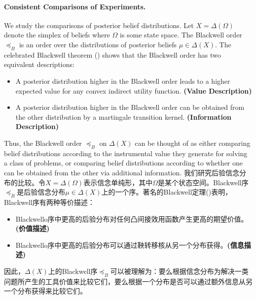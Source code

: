 \documentclass[12pt,letterpaper]{article}
\newenvironment{original}{\color{black}}{}
\newenvironment{translation}{\color{blue}}{}
\theoremstyle{plain}
\theoremstyle{definition}
\theoremstyle{remark}
\theoremstyle{definition}
\begin{document}
\paragraph{Consistent Comparisons of Experiments.}\hspace{-2mm}
\begin{original}
We study the comparisons of posterior belief distributions. Let $X=\Delta(\Omega)$ denote the simplex of beliefs where $\Omega$ is some state space. The Blackwell order $\preceq_B$ is an order over the distributions of posterior beliefs $\mu \in \Delta(X)$. The celebrated Blackwell theorem (\citealt{Blackwell1951Comparison}) shows that the Blackwell order has two equivalent descriptions:
\begin{itemize}
    \item[(i)] A posterior distribution higher in the Blackwell order leads to a higher expected value for any convex indirect utility function. \qquad \qquad  \qquad   \quad     \textbf{(Value Description)}
    \item[(ii)] A posterior distribution higher in the Blackwell order can be obtained from the other distribution by a martingale transition kernel. \quad        \textbf{(Information Description)}
\end{itemize}
Thus, the Blackwell order $\preceq_B$ on $\Delta(X)$ can be thought of as either comparing belief distributions according to the instrumental value they generate for solving a class of problems, or comparing belief distributions according to whether one can be obtained from the other via additional information.
\end{original}
\begin{translation}
我们研究后验信念分布的比较。令$X=\Delta(\Omega)$表示信念单纯形，其中$\Omega$是某个状态空间。Blackwell序$\preceq_B$是后验信念分布$\mu \in \Delta(X)$上的一个序。著名的Blackwell定理(\citealt{Blackwell1951Comparison})表明，Blackwell序有两种等价描述：
\begin{itemize}
    \item[(i)] Blackwello序中更高的后验分布对任何凸间接效用函数产生更高的期望价值。\qquad \qquad \qquad \quad \textbf{(价值描述)}
    \item[(ii)] Blackwello序中更高的后验分布可以通过鞅转移核从另一个分布获得。\quad \textbf{(信息描述)}
\end{itemize}
因此，$\Delta(X)$上的Blackwell序$\preceq_B$可以被理解为：要么根据信念分布为解决一类问题所产生的工具价值来比较它们，要么根据一个分布是否可以通过额外信息从另一个分布获得来比较它们。
\end{translation}
\end{document}
